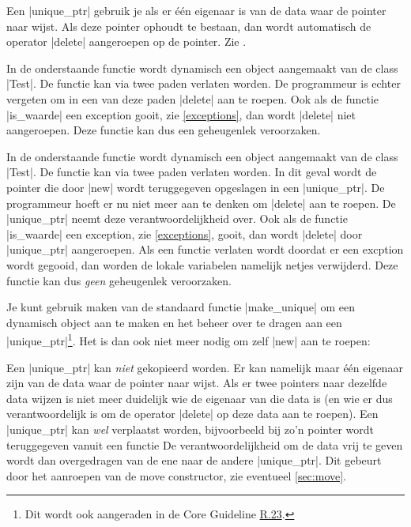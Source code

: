 \begin{cpplstShortInline}
Een |unique_ptr| gebruik je als er één eigenaar is van de data waar de pointer naar wijst.
Als deze pointer ophoudt te bestaan, dan wordt automatisch de operator |delete| aangeroepen op de pointer.
Zie .

In de onderstaande functie wordt dynamisch een object aangemaakt van de class |Test|.
De functie kan via twee paden verlaten worden.
De programmeur is echter vergeten om in een van deze paden |delete| aan te roepen.
Ook als de functie |is_waarde| een exception gooit, zie \cref{exceptions}, dan wordt |delete| niet aangeroepen.
Deze functie kan dus een geheugenlek veroorzaken. 
 

In de onderstaande functie wordt dynamisch een object aangemaakt van de class |Test|.
De functie kan via twee paden verlaten worden.
In dit geval wordt de pointer die door |new| wordt teruggegeven opgeslagen in een |unique_ptr|.
De programmeur hoeft er nu niet meer aan te denken om |delete| aan te roepen.
De |unique_ptr| neemt deze verantwoordelijkheid over.
Ook als de functie |is_waarde| een exception, zie \cref{exceptions}, gooit, dan wordt |delete| door |unique_ptr| aangeroepen.
Als een functie verlaten wordt doordat er een excption wordt gegooid, dan worden de lokale variabelen namelijk netjes verwijderd.
Deze functie kan dus \emph{geen} geheugenlek veroorzaken. 


Je kunt gebruik maken van de standaard functie |make_unique| om een dynamisch object aan te maken en het beheer over te dragen aan een |unique_ptr|\footnote{%
	Dit wordt ook aangeraden in de \Cpp{} Core Guideline \href{https://isocpp.github.io/CppCoreGuidelines/CppCoreGuidelines\#r23-use-make_unique-to-make-unique_ptrs}{R.23}.
}.
Het is dan ook niet meer nodig om zelf |new| aan te roepen:


Een |unique_ptr| kan \emph{niet} gekopieerd worden.
Er kan namelijk maar één eigenaar zijn van de data waar de pointer naar wijst.
Als er twee pointers naar dezelfde data wijzen is niet meer duidelijk wie de eigenaar van die data is (en wie er dus verantwoordelijk is om de operator |delete| op deze data aan te roepen).
Een |unique_ptr| kan \emph{wel} verplaatst worden, bijvoorbeeld bij zo'n pointer wordt teruggegeven vanuit een functie
De verantwoordelijkheid om de data vrij te geven wordt dan overgedragen van de ene naar de andere |unique_ptr|. Dit gebeurt door het aanroepen van de move constructor, zie eventueel \cref{sec:move}.


\end{cpplstShortInline}
